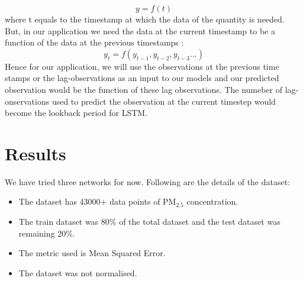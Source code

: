 \documentclass{report}
\begin{document}
\begin{equation}
y = f(t)\label{eq}
\end{equation}
where t equals to the timestamp at which the data of the quantity is needed.\\
But, in our application we need the data at the current timestamp to be a function of the data at the previous timestamps :
\begin{equation}
y_{t} = f(y_{t-1}, y_{t-2}, y_{t-3} ...)\label{eq}
\end{equation}
Hence for our application, we will use the observations at the previous time stamps or the lag-observations as an input to our models and our predicted observation would be the function of these lag observations. The numeber of lag-onservations used to predict the observation at the current timestep would become the lookback period for LSTM.

\section{Results}                                                                					 %
\hspace{1.5cm}We have tried three networks for now. Following are the details of the dataset:
\begin{itemize}
	\item The dataset has 43000+ data points of PM$_{2.5}$ concentration.
	\item The train dataset was 80$\%$ of the total dataset and the test dataset was remaining 20$\%$.
	\item The metric used is Mean Squared Error.
	\item The dataset was not normalised.
\end{itemize}
\newpage
\end{document}
